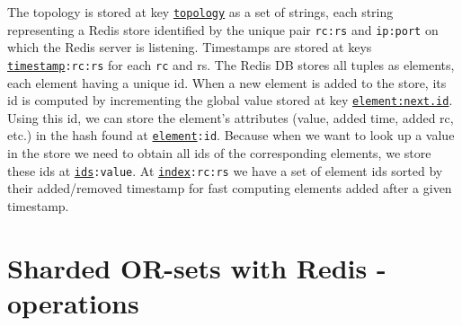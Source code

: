 The topology is stored at key \texttt{\underline{topology}} as a set of strings,
each string representing a Redis store identified by the unique pair
\texttt{rc:rs} and \texttt{ip:port} on which the Redis server is listening.
Timestamps are stored at keys \texttt{\underline{timestamp}:rc:rs} for each
\texttt{rc} and {rs}. The Redis DB stores all tuples as elements, each element
having a unique id. When a new element is added to the store, its id is computed
by incrementing the global value stored at key
\texttt{\underline{element:next.id}}. Using this id, we can store the element's
attributes (value, added time, added rc, etc.) in the hash found at
\texttt{\underline{element}:id}. Because when we want to look up a value in the
store we need to obtain all ids of the corresponding elements, we store these
ids at \texttt{\underline{ids}:value}. At \texttt{\underline{index}:rc:rs} we
have a set of element ids sorted by their added/removed timestamp for fast
computing elements added after a given timestamp.

\clearpage

\section{Sharded OR-sets with Redis - operations}

